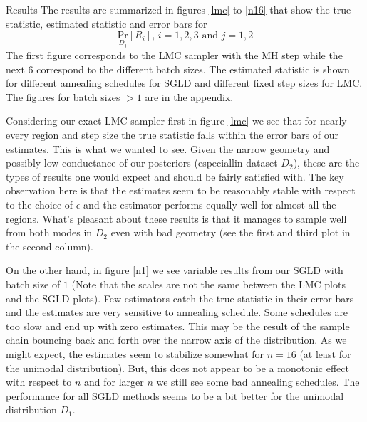 \documentclass{article}
\newcommand{\Prob}[2]{\underset{#2}{\mbox{Pr}}\!\left[#1\right]}
\begin{document}
\begin{section}{Results}
The results are summarized in figures \ref{lmc} to \ref{n16} that show the true statistic, estimated statistic and error bars for
$$\Prob{R_i}{D_j},\,i=1,2,3\text{ and }j=1,2$$
The first figure corresponds to the LMC sampler with the MH step while the next 6 correspond to the different batch sizes.  The estimated statistic is shown for different annealing schedules for SGLD and different fixed step sizes for LMC.  The figures for batch sizes $>1$ are in the appendix.

Considering our exact LMC sampler first in figure \ref{lmc} we see that for nearly every region and step size the true statistic falls within the error bars of our estimates.  This is what we wanted to see.  Given the narrow geometry and possibly low conductance of our posteriors (especiallin dataset $D_2$), these are the types of results one would expect and should be fairly satisfied with.  The key observation here is that the estimates seem to be reasonably stable with respect to the choice of $\epsilon$ and the estimator performs equally well for almost all the regions.  What's pleasant about these results is that it manages to sample well from both modes in $D_2$ even with bad geometry (see the first and third plot in the second column).

On the other hand, in figure \ref{n1} we see variable results from our SGLD with batch size of $1$ (Note that the scales are not the same between the LMC plots and the SGLD plots).  Few estimators catch the true statistic in their error bars and the estimates are very sensitive to annealing schedule.  Some schedules are too slow and end up with zero estimates. This may be the result of the sample chain bouncing back and forth over the narrow axis of the distribution.  As we might expect, the estimates seem to stabilize somewhat for $n=16$ (at least for the unimodal distribution).  But, this does not appear to be a monotonic effect with respect to $n$ and for larger $n$ we still see some bad annealing schedules.  The performance for all SGLD methods seems to be a bit better for the unimodal distribution $D_1$.


\end{section}
\end{document}
